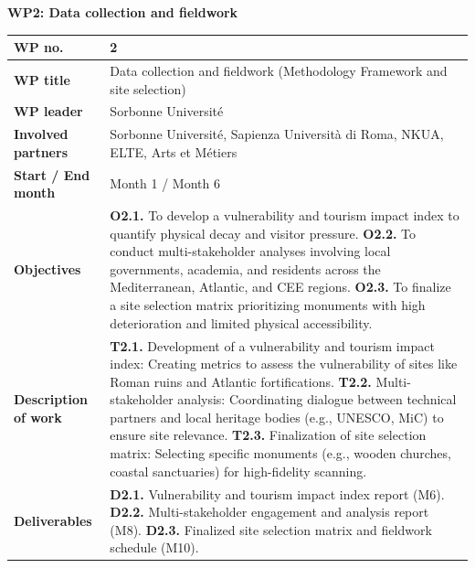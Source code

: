 \textbf{WP2: Data collection and fieldwork}
\begin{table}[H]
\centering
\small
\renewcommand{\arraystretch}{1.2}
\begin{tabularx}{\textwidth}{|l|X|}
\hline
\rowcolor{gray!10} \textbf{WP no.} & 2 \\ \hline
\textbf{WP title} & Data collection and fieldwork (Methodology Framework and site selection) \\ \hline
\textbf{WP leader} & Sorbonne Université  \\ \hline
\textbf{Involved partners} & Sorbonne Université, Sapienza Università di Roma, NKUA, ELTE, Arts et Métiers  \\ \hline
\textbf{Start / End month} & Month 1 / Month 6 \\ \hline
\textbf{Objectives} & \textbf{O2.1.} To develop a vulnerability and tourism impact index to quantify physical decay and visitor pressure. \newline \textbf{O2.2.} To conduct multi-stakeholder analyses involving local governments, academia, and residents across the Mediterranean, Atlantic, and CEE regions. \newline \textbf{O2.3.} To finalize a site selection matrix prioritizing monuments with high deterioration and limited physical accessibility. \\ \hline
\textbf{Description of work} & \textbf{T2.1.} Development of a vulnerability and tourism impact index: Creating metrics to assess the vulnerability of sites like Roman ruins and Atlantic fortifications. \newline \textbf{T2.2.} Multi-stakeholder analysis: Coordinating dialogue between technical partners and local heritage bodies (e.g., UNESCO, MiC) to ensure site relevance. \newline \textbf{T2.3.} Finalization of site selection matrix: Selecting specific monuments (e.g., wooden churches, coastal sanctuaries) for high-fidelity scanning. \\ \hline
\textbf{Deliverables} & \textbf{D2.1.} Vulnerability and tourism impact index report (M6). \newline \textbf{D2.2.} Multi-stakeholder engagement and analysis report (M8). \newline \textbf{D2.3.} Finalized site selection matrix and fieldwork schedule (M10). \\ \hline
\end{tabularx}
\end{table}